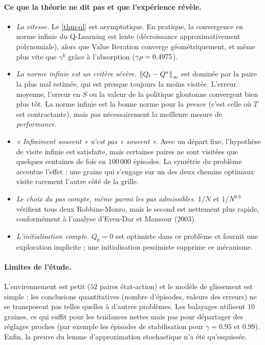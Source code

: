 \paragraph{Ce que la théorie ne dit pas et que l'expérience révèle.}
\begin{itemize}
\item \emph{La vitesse.} Le \cref{thm-ql} est asymptotique. En pratique, la convergence en norme infinie du Q-Learning est lente (décroissance approximativement polynomiale), alors que Value Iteration converge géométriquement, et même plus vite que $\gamma^k$ grâce à l'absorption ($\gamma\rho=0.4975$).
\item \emph{La norme infinie est un critère sévère.} $\left\lVert Q_t-Q^* \right\rVert_\infty$ est dominée par la paire la plus mal estimée, qui est presque toujours la moins visitée. L'erreur moyenne, l'erreur en $S$ ou la valeur de la politique gloutonne convergent bien plus tôt. La norme infinie est la bonne norme pour la \emph{preuve} (c'est celle où $T$ est contractante), mais pas nécessairement la meilleure mesure de \emph{performance}.
\item \emph{« Infiniment souvent » n'est pas « souvent ».} Avec un départ fixe, l'hypothèse de visite infinie est satisfaite, mais certaines paires ne sont visitées que quelques centaines de fois en $100\,000$ épisodes. La symétrie du problème accentue l'effet : une graine qui s'engage sur un des deux chemins optimaux visite rarement l'autre côté de la grille.
\item \emph{Le choix du pas compte, même parmi les pas admissibles.} $1/N$ et $1/N^{0.8}$ vérifient tous deux Robbins-Monro, mais le second est nettement plus rapide, conformément à l'analyse d'Even-Dar et Mansour (2003).
\item \emph{L'initialisation compte.} $Q_0=0$ est optimiste dans ce problème et fournit une exploration implicite ; une initialisation pessimiste supprime ce mécanisme.
\end{itemize}

\paragraph{Limites de l'étude.} L'environnement est petit ($52$ paires état-action) et le modèle de glissement est simple ; les conclusions quantitatives (nombre d'épisodes, valeurs des erreurs) ne se transposent pas telles quelles à d'autres problèmes. Les balayages utilisent $10$ graines, ce qui suffit pour les tendances nettes mais pas pour départager des réglages proches (par exemple les épisodes de stabilisation pour $\gamma=0.95$ et $0.99$). Enfin, la preuve du lemme d'approximation stochastique n'a été qu'esquissée.

